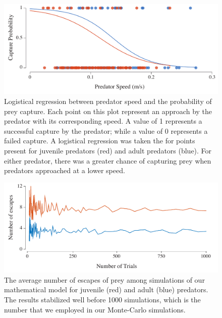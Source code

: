 \documentclass[11pt]{article}
\begin{document}
\begin{figure}[!h]
\centering
	\includegraphics[width=5.5in]{supp_pred_speed_vs_capture}
\caption{Logistical regression between predator speed and the probability of prey capture.
Each point on this plot represent an approach by the predator with its corresponding speed.
A value of 1 represents a successful capture by the predator; while a value of 0 represents a failed capture. 
A logistical regression was taken the for points present for juvenile predators (red) and adult predators (blue).
For either predator, there was a greater chance of capturing prey when predators approached at a lower speed.
}
\label{fig_sense}
\end{figure}

\begin{figure}[!h]
\centering
	\includegraphics[width=5.5in]{supp_num_trials}
\caption{The average number of escapes of prey among simulations of our mathematical model for juvenile (red) and adult (blue) predators.
The results stabilized well before 1000 simulations, which is the number that we employed in our Monte-Carlo simulations.
}
\label{fig_sense}
\end{figure}
\end{document}
